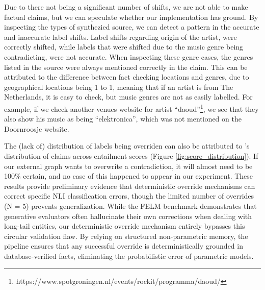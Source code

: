 Due to there not being a significant number of shifts, we are not able to make factual claims, but we can speculate whether our implementation has ground. By inspecting the types of synthezied source, we can detect a pattern in the accurate and inaccurate label shifts. Label shifts regarding origin of the artist, were correctly shifted, while labels that were shifted due to the music genre being contradicting, were not accurate. When inspecting these genre cases, the genres listed in the source were always mentioned correctly in the claim. This can be attributed to the difference between fact checking locations and genres, due to geographical locations being 1 to 1, meaning that if an artist is from The Netherlands, it is easy to check, but music genres are not as easily labelled. For example, if we check another venues website for artist ``daoud''\footnote{https://www.spotgroningen.nl/events/rockit/programma/daoud/}, we see that they also show his music as being ``elektronica'', which was not mentioned on the Doornroosje website. 

The (lack of) distribution of labels being overriden can also be attributed to \rob's distribution of claims across entailment scores (Figure \ref{fig:score_distribution}). If our external graph wants to overwrite a contradiction, it will almost need to be 100\% certain, and no case of this happened to appear in our experiment. 
These results provide preliminary evidence that deterministic override mechanisms can correct specific NLI classification errors, though the limited number of overrides (N = 5) prevents generalization. While the FELM benchmark \cite{chen2023felm} demonstrates that generative evaluators often hallucinate their own corrections when dealing with long-tail entities, our deterministic override mechanism entirely bypasses this circular validation flaw. By relying on structured non-parametric memory, the pipeline ensures that any successful override is deterministically grounded in database-verified facts, eliminating the probabilistic error of parametric models.



